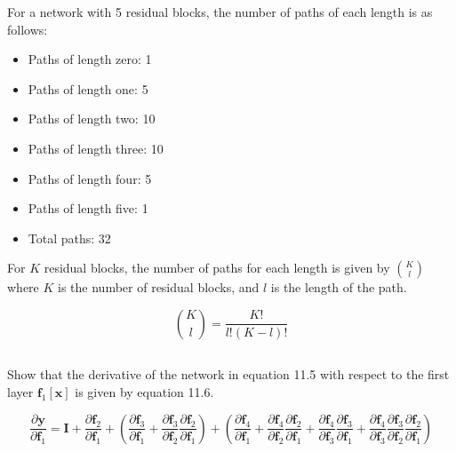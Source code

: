 \documentclass[12pt]{report}
\begin{document}
For a network with 5 residual blocks, the number of paths of each length is as follows:

\begin{itemize}
    \item Paths of length zero: 1
    \item Paths of length one: 5
    \item Paths of length two: 10
    \item Paths of length three: 10
    \item Paths of length four: 5
    \item Paths of length five: 1
    \item Total paths: 32
\end{itemize}

For $K$ residual blocks, the number of paths for each length is given by $\binom{K}{l}$ where $K$ is the number of residual blocks, and $l$ is the length of the path.

\begin{equation*}
    \binom{K}{l} = \frac{K!}{l!(K-l)!}
\end{equation*}

\subsection{}
\begin{mdframed}
    Show that the derivative of the network in equation 11.5 with respect to the first layer $\mathbf{f}_{1}[\mathbf{x}]$ is given by equation 11.6.

    \begin{equation}
        \frac{\partial \mathbf{y}}{\partial \mathbf{f}_{1}} = \mathbf{I} + \frac{\partial \mathbf{f}_{2}}{\partial \mathbf{f}_{1}} + \left(\frac{\partial \mathbf{f}_{3}}{\partial \mathbf{f}_{1}} + \frac{\partial \mathbf{f}_{3}}{\partial \mathbf{f}_{2}}\frac{\partial \mathbf{f}_{2}}{\partial \mathbf{f}_{1}}\right) + \left(\frac{\partial \mathbf{f}_{4}}{\partial \mathbf{f}_{1}} + \frac{\partial \mathbf{f}_{4}}{\partial \mathbf{f}_{2}}\frac{\partial \mathbf{f}_{2}}{\partial \mathbf{f}_{1}} + \frac{\partial \mathbf{f}_{4}}{\partial \mathbf{f}_{3}}\frac{\partial \mathbf{f}_{3}}{\partial \mathbf{f}_{1}} +\frac{\partial \mathbf{f}_{4}}{\partial \mathbf{f}_{3}}\frac{\partial \mathbf{f}_{3}}{\partial \mathbf{f}_{2}}\frac{\partial \mathbf{f}_{2}}{\partial \mathbf{f}_{1}}\right)
        \label{eq:11.6}
        \tag{11.6}
    \end{equation}
\end{mdframed}
\end{document}
